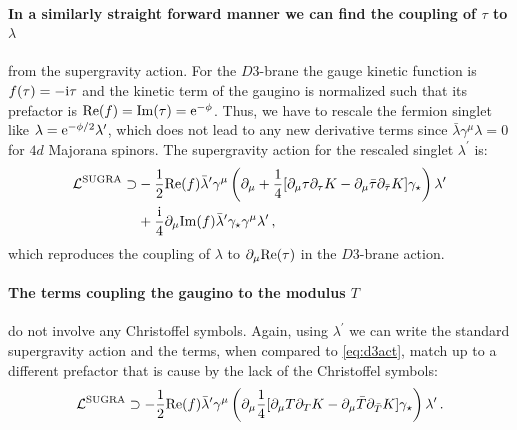\documentclass[12pt]{report}
\newcommand{\be}{\begin{equation}}
\newcommand{\ee}{\end{equation}}
\newcommand{\bea}{\begin{equation}\begin{aligned}}
\newcommand{\eea}{\end{aligned}\end{equation}}
\def\rmi{{\rm i}}
\def\rme{{\rm e}}
\def\rmre{{\rm Re}}
\def\rmim{{\rm Im}}
\begin{document}
\paragraph{In a similarly straight forward manner we can find the coupling of $\tau$ to $\lambda$} from the supergravity action. For the $D3$-brane the gauge kinetic function is $f(\tau) = -\rmi \tau$ and the kinetic term of the gaugino is normalized such that its prefactor is $\rmre(f) = \rmim(\tau) = \rme^{-\phi}$. Thus, we have to rescale the fermion singlet like $\lambda = \rme^{-\phi/2} \lambda^\prime$, which does not lead to any new derivative terms since $\bar{\lambda} \gamma^\mu \lambda =0$ for $4d$ Majorana spinors. The supergravity action for the rescaled singlet $\lambda^\prime$ is:
\bea 
\mathcal{L}^{\text{SUGRA}} \supset &-\frac{1}{2} \rmre(f) \bar{\lambda}^\prime \gamma^\mu \left( \partial_\mu + \frac{1}{4} [\partial_\mu \tau \partial_\tau K - \partial_\mu \bar{\tau} \partial_{\bar{\tau}} K ] \gamma_\star \right) \lambda^\prime\\
&+ \frac{\rmi}{4} \partial_\mu \rmim(f)\bar{\lambda}^\prime \gamma_\star \gamma^\mu \lambda^\prime\,,
\eea
which reproduces the coupling of $\lambda$ to $\partial_\mu \rmre(\tau)$ in the $D3$-brane action.
\paragraph{The terms coupling the gaugino to the modulus $T$} do not involve any Christoffel symbols. Again, using $\lambda^\prime$ we can write the standard supergravity action and the terms, when compared to \eqref{eq:d3act}, match up to a different prefactor that is cause by the lack of the Christoffel symbols:
\be
\mathcal{L}^{\text{SUGRA}} \supset - \frac{1}{2} \rmre(f) \bar{\lambda}^\prime \gamma^\mu \left( \partial_\mu \frac{1}{4} [\partial_\mu T \partial_T K - \partial_\mu \bar{T} \partial_{\bar{T}} K]\gamma_\star\right) \lambda^\prime\,.
\ee
\end{document}
